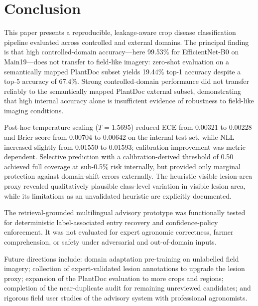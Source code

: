 \documentclass[conference]{IEEEtran}
\begin{document}
\section{Conclusion}
\label{sec:conclusion}

This paper presents a reproducible, leakage-aware crop disease
classification pipeline evaluated across controlled and external
domains. The principal finding is that high controlled-domain
accuracy---here 99.53\% for EfficientNet-B0 on Main19---does not
transfer to field-like imagery: zero-shot evaluation on a
semantically mapped PlantDoc subset yields 19.44\% top-1 accuracy
despite a top-5 accuracy of 67.4\%. Strong controlled-domain
performance did not transfer reliably to the semantically mapped
PlantDoc external subset, demonstrating that high internal accuracy
alone is insufficient evidence of robustness to field-like imaging
conditions.

Post-hoc temperature scaling ($T\!=\!1.5695$) reduced ECE from
0.00321 to 0.00228 and Brier score from 0.00704 to 0.00642 on the
internal test set, while NLL increased slightly from 0.01550 to
0.01593; calibration improvement was metric-dependent. Selective
prediction with a calibration-derived threshold of 0.50 achieved
full coverage at sub-0.5\% risk internally, but provided only
marginal protection against domain-shift errors externally. The
heuristic visible lesion-area proxy revealed qualitatively plausible
class-level variation in visible lesion area, while its limitations
as an unvalidated heuristic are explicitly documented.

The retrieval-grounded multilingual advisory prototype was
functionally tested for deterministic label-associated entry recovery
and confidence-policy enforcement. It was not evaluated for expert
agronomic correctness, farmer comprehension, or safety under
adversarial and out-of-domain inputs.

Future directions include: domain adaptation pre-training on
unlabelled field imagery; collection of expert-validated lesion
annotations to upgrade the lesion proxy; expansion of the PlantDoc
evaluation to more crops and regions; completion of the near-duplicate
audit for remaining unreviewed candidates; and rigorous field user
studies of the advisory system with professional agronomists.

\end{document}
